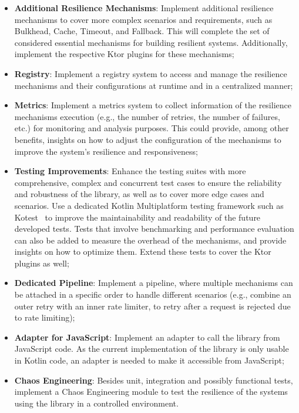 \begin{itemize}
    \item \textbf{Additional Resilience Mechanisms}:
    Implement additional resilience mechanisms to cover more complex scenarios and requirements, such as Bulkhead,
    Cache, Timeout, and Fallback.
    This will complete the set of considered essential mechanisms for building resilient systems.
    Additionally, implement the respective Ktor plugins for these mechanisms;
    \item \textbf{Registry}:
    Implement a registry system
    to access and manage the resilience mechanisms and their configurations at runtime and in a centralized manner;
    \item \textbf{Metrics}:
    Implement a metrics system to collect information of the resilience mechanisms execution (e.g., the number of retries, the number of failures, etc.) for monitoring and analysis purposes. This could provide, among other benefits, insights on how to adjust the configuration of the mechanisms to improve the system’s resilience and responsiveness;
    \item \textbf{Testing Improvements}:
    Enhance the testing suites with more comprehensive, complex and concurrent test cases
    to ensure the reliability and robustness of the library, as well as to cover more edge cases and scenarios.
    Use a dedicated Kotlin Multiplatform testing framework such as Kotest~\cite{kotest}
    to improve the maintainability and readability of the future developed tests.
    Tests that involve benchmarking and performance evaluation can also be added to measure the overhead of the mechanisms,
    and provide insights on how to optimize them.
    Extend these tests to cover the Ktor plugins as well;
    \item \textbf{Dedicated Pipeline}:
    Implement a pipeline,
    where multiple mechanisms can be attached in a specific order to handle different scenarios (e.g., combine an outer retry with an inner rate limiter, to retry after a request is rejected due to rate limiting);
    \item \textbf{Adapter for JavaScript}: Implement an adapter to call the library from JavaScript code.
    As the current implementation of the library is only usable in Kotlin code, an adapter is needed to make it accessible from JavaScript;
    \item \textbf{Chaos Engineering}:
    Besides unit, integration and possibly functional tests,
    implement a Chaos Engineering module to test the resilience of the systems using the library in a controlled environment.

\end{itemize}
